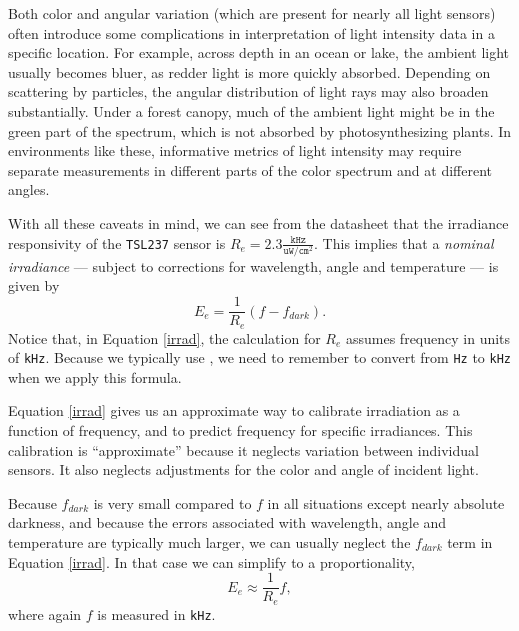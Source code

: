 Both color and angular variation (which are present for nearly all light sensors) often introduce some complications in interpretation of light intensity data in a specific location.
For example, across depth in an ocean or lake, the ambient light usually becomes bluer, as redder light is more quickly absorbed.
Depending on scattering by particles, the angular distribution of light rays may also broaden substantially.
Under a forest canopy, much of the ambient light might be in the green part of the spectrum, which is not absorbed by photosynthesizing plants.
In environments like these, informative metrics of light intensity may require separate measurements in different parts of the color spectrum and at different angles.

With all these caveats in mind, we can see from the datasheet that the irradiance responsivity of the \texttt{TSL237} sensor is $R_e=2.3 \frac{\mathtt{kHz}}{\mathtt{uW}/\mathtt{cm}^2}$.
This implies that a \emph{nominal irradiance} --- subject to corrections for wavelength, angle and temperature --- is given by
\begin{equation}\label{irrad}
E_e = \frac{1}{R_e} (f-f_{dark}) .
\end{equation}
Notice that, in Equation \ref{irrad}, the calculation for $R_e$ assumes frequency in units of \texttt{kHz}.
Because we typically use , we need to remember to convert from \texttt{Hz} to \texttt{kHz} when we apply this formula.

Equation \ref{irrad} gives us an approximate way to calibrate irradiation as a function of frequency, and to predict frequency for specific irradiances.
This calibration is ``approximate'' because it neglects variation between individual sensors.
It also neglects adjustments for the color and angle of incident light.

Because $f_{dark}$ is very small compared to $f$ in all situations except nearly absolute darkness, and because the errors associated with wavelength, angle and temperature are typically much larger, we can usually neglect the $f_{dark}$ term in Equation \ref{irrad}.
In that case we can simplify to a proportionality,
\begin{equation}\label{irrad2}
E_e \approx \frac{1}{R_e} f,
\end{equation}
where again $f$ is measured in \texttt{kHz}.

